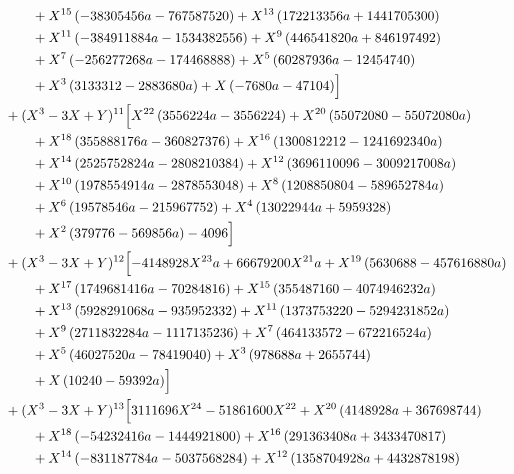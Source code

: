 \begin{align*}
&\qquad + X^{15} \left(- 38305456 a - 767587520\right) + X^{13} \left(172213356 a + 1441705300\right)\\
&\qquad + X^{11} \left(- 384911884 a - 1534382556\right) + X^{9} \left(446541820 a + 846197492\right)\\
&\qquad + X^{7} \left(- 256277268 a - 174468888\right) + X^{5} \left(60287936 a - 12454740\right)\\
&\qquad + X^{3} \left(3133312 - 2883680 a\right) + X \left(- 7680 a - 47104\right)\Bigr]\\
&{}+(X^3-3X+Y)^{11}\Bigl[X^{22} \left(3556224 a - 3556224\right) + X^{20} \left(55072080 - 55072080 a\right)\\
&\qquad + X^{18} \left(355888176 a - 360827376\right) + X^{16} \left(1300812212 - 1241692340 a\right)\\
&\qquad + X^{14} \left(2525752824 a - 2808210384\right) + X^{12} \left(3696110096 - 3009217008 a\right)\\
&\qquad + X^{10} \left(1978554914 a - 2878553048\right) + X^{8} \left(1208850804 - 589652784 a\right)\\
&\qquad + X^{6} \left(19578546 a - 215967752\right) + X^{4} \left(13022944 a + 5959328\right)\\
&\qquad + X^{2} \left(379776 - 569856 a\right) - 4096\Bigr]\\
&{}+(X^3-3X+Y)^{12}\Bigl[- 4148928 X^{23} a + 66679200 X^{21} a + X^{19} \left(5630688 - 457616880 a\right)\\
&\qquad + X^{17} \left(1749681416 a - 70284816\right) + X^{15} \left(355487160 - 4074946232 a\right)\\
&\qquad + X^{13} \left(5928291068 a - 935952332\right) + X^{11} \left(1373753220 - 5294231852 a\right)\\
&\qquad + X^{9} \left(2711832284 a - 1117135236\right) + X^{7} \left(464133572 - 672216524 a\right)\\
&\qquad + X^{5} \left(46027520 a - 78419040\right) + X^{3} \left(978688 a + 2655744\right)\\
&\qquad + X \left(10240 - 59392 a\right)\Bigr]\\
&{}+(X^3-3X+Y)^{13}\Bigl[3111696 X^{24} - 51861600 X^{22} + X^{20} \left(4148928 a + 367698744\right)\\
&\qquad + X^{18} \left(- 54232416 a - 1444921800\right) + X^{16} \left(291363408 a + 3433470817\right)\\
&\qquad + X^{14} \left(- 831187784 a - 5037568284\right) + X^{12} \left(1358704928 a + 4432878198\right)\\

\end{align*}
